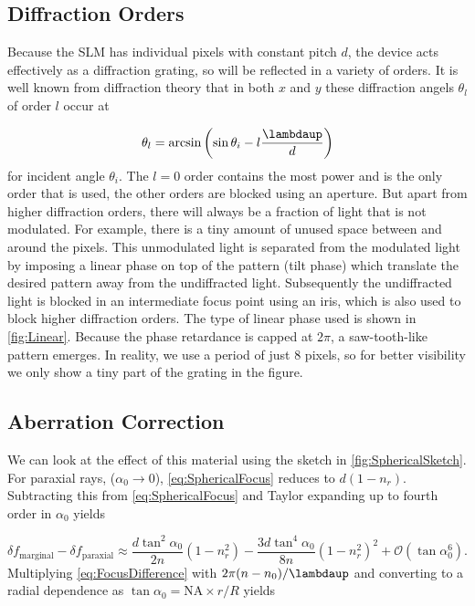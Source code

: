 \subsection{Diffraction Orders}\label{subsec:Diffraction}

Because the SLM has individual pixels with constant pitch $d$, the device acts effectively as a diffraction grating, so will be reflected in a variety of orders. 
It is well known from diffraction theory that in both $x$ and $y$ these diffraction angels $\theta_l$ of order $l$ occur at \cite{Hecht2002}

\begin{equation}
	\theta_l = \arcsin\left(\sin\theta_i - l\frac{ \lambdaup}{d}\right)
\end{equation}
for incident angle $\theta_i$. 
The $l=0$ order contains the most power and is the only order that is used, the other orders are blocked using an aperture. 
But apart from higher diffraction orders, there will always be a fraction of light that is not modulated. 
For example, there is a tiny amount of unused space between and around the pixels.
This unmodulated light is separated from the modulated light by imposing a linear phase on top of the pattern (tilt phase) which translate the desired pattern away from the undiffracted light.
Subsequently the undiffracted light is blocked in an intermediate focus point using an iris, which is also used to block higher diffraction orders.
The type of linear phase used is shown in \cref{fig:Linear}.
Because the phase retardance is capped at $2\pi$, a saw-tooth-like pattern emerges.
In reality, we use a period of just 8 pixels, so for better visibility we only show a tiny part of the grating in the figure.



\subsection{Aberration Correction}\label{subsec:AberrationCorrection}


We can look at the effect of this material using the sketch in \cref{fig:SphericalSketch}. 
For paraxial rays, ($\alpha_0 \rightarrow 0$), \cref{eq:SphericalFocus} reduces to $d(1-n_r)$. 
Subtracting this from \cref{eq:SphericalFocus} and Taylor expanding up to fourth order in $\alpha_0$ yields 

\begin{equation}\label{eq:FocusDifference}
    \delta f_{\text{marginal}} - \delta f_{\text{paraxial}} \approx
    \frac{d \tan^2{\alpha_0}}{2n} (1-n_r^2) - \frac{3d \tan^4{\alpha_0}}{8n}(1-n_r^2)^2+\mathcal{O}(\tan\alpha_0^6).
\end{equation}
Multiplying \cref{eq:FocusDifference} with $2\pi(n-n_0)/\lambdaup$ and converting to a radial dependence as $\tan{\alpha_0}= \text{NA} \times r/R$ yields \cite{Iwaniuk2011}

